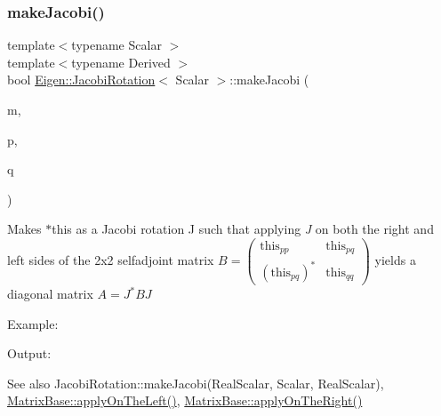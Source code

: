 \subsubsection{\texorpdfstring{makeJacobi()}{makeJacobi()}\hspace{0.1cm}{\footnotesize\ttfamily [1/2]}}
{\footnotesize\ttfamily template$<$typename Scalar $>$ \\
template$<$typename Derived $>$ \\
bool \mbox{\hyperlink{class_eigen_1_1_jacobi_rotation}{Eigen\+::\+Jacobi\+Rotation}}$<$ Scalar $>$\+::make\+Jacobi (\begin{DoxyParamCaption}\item[{const \mbox{\hyperlink{class_eigen_1_1_matrix_base}{Matrix\+Base}}$<$ Derived $>$ \&}]{m,  }\item[{Index}]{p,  }\item[{Index}]{q }\end{DoxyParamCaption})\hspace{0.3cm}{\ttfamily [inline]}}

Makes {\ttfamily $\ast$this} as a Jacobi rotation {\ttfamily J} such that applying {\itshape J} on both the right and left sides of the 2x2 selfadjoint matrix $ B = \left ( \begin{array}{cc} \text{this}_{pp} & \text{this}_{pq} \\ (\text{this}_{pq})^* & \text{this}_{qq} \end{array} \right )$ yields a diagonal matrix $ A = J^* B J $

Example\+: 
\begin{DoxyCodeInclude}{0}
\end{DoxyCodeInclude}
 Output\+: 
\begin{DoxyVerbInclude}
\end{DoxyVerbInclude}


\begin{DoxySeeAlso}{See also}
Jacobi\+Rotation\+::make\+Jacobi(\+Real\+Scalar, Scalar, Real\+Scalar), \mbox{\hyperlink{class_eigen_1_1_matrix_base_a3a08ad41e81d8ad4a37b5d5c7490e765}{Matrix\+Base\+::apply\+On\+The\+Left()}}, \mbox{\hyperlink{class_eigen_1_1_matrix_base_a45d91752925d2757fc8058a293b15462}{Matrix\+Base\+::apply\+On\+The\+Right()}} 
\end{DoxySeeAlso}
\mbox{\label{class_eigen_1_1_jacobi_rotation_a6572f272cac38e070a99b466dd1fbc74}} 
